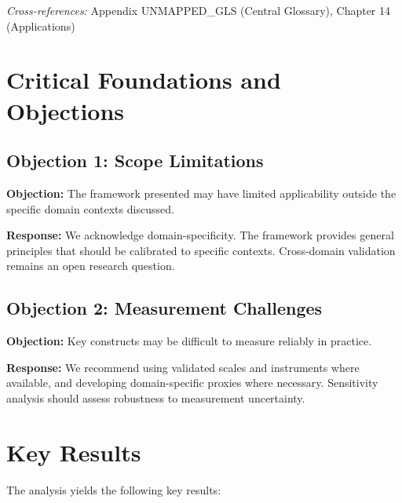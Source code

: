 \noindent\textit{Cross-references:}
Appendix UNMAPPED_GLS (Central Glossary), Chapter 14 (Applications)



\section{Critical Foundations and Objections}
\label{sec:cam-foundations}

\subsection{Objection 1: Scope Limitations}

\textbf{Objection:} The framework presented may have limited applicability
outside the specific domain contexts discussed.

\textbf{Response:} We acknowledge domain-specificity. The framework provides
general principles that should be calibrated to specific contexts. Cross-domain
validation remains an open research question.

\subsection{Objection 2: Measurement Challenges}

\textbf{Objection:} Key constructs may be difficult to measure reliably in
practice.

\textbf{Response:} We recommend using validated scales and instruments where
available, and developing domain-specific proxies where necessary. Sensitivity
analysis should assess robustness to measurement uncertainty.





\section{Key Results}
\label{sec:cam-results}

The analysis yields the following key results:

